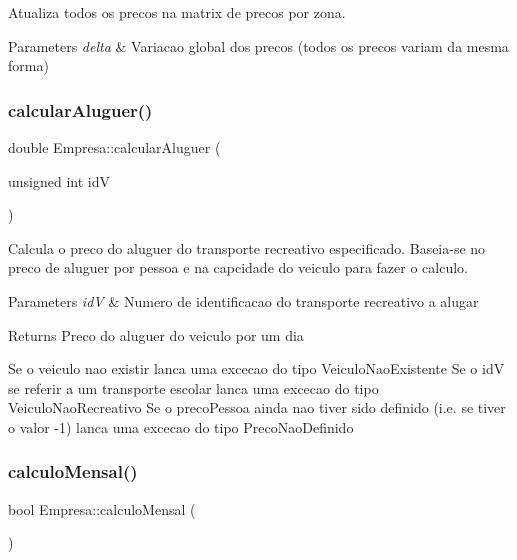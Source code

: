 Atualiza todos os precos na matrix de precos por zona. 


\begin{DoxyParams}{Parameters}
{\em delta} & Variacao global dos precos (todos os precos variam da mesma forma) \\
\hline
\end{DoxyParams}
\mbox{\label{class_empresa_a1aeac933b91a2abfb92d11ba51fe3699}} 
\subsubsection{\texorpdfstring{calcular\+Aluguer()}{calcularAluguer()}}
{\footnotesize\ttfamily double Empresa\+::calcular\+Aluguer (\begin{DoxyParamCaption}\item[{unsigned int}]{idV }\end{DoxyParamCaption})}



Calcula o preco do aluguer do transporte recreativo especificado. Baseia-\/se no preco de aluguer por pessoa e na capcidade do veiculo para fazer o calculo. 


\begin{DoxyParams}{Parameters}
{\em idV} & Numero de identificacao do transporte recreativo a alugar\\
\hline
\end{DoxyParams}
\begin{DoxyReturn}{Returns}
Preco do aluguer do veiculo por um dia
\end{DoxyReturn}
Se o veiculo nao existir lanca uma excecao do tipo Veiculo\+Nao\+Existente Se o idV se referir a um transporte escolar lanca uma excecao do tipo Veiculo\+Nao\+Recreativo Se o preco\+Pessoa ainda nao tiver sido definido (i.\+e. se tiver o valor -\/1) lanca uma excecao do tipo Preco\+Nao\+Definido \mbox{\label{class_empresa_a4a1e541280c5f7ae9e3f418d33b4cbd2}} 
\subsubsection{\texorpdfstring{calculo\+Mensal()}{calculoMensal()}}
{\footnotesize\ttfamily bool Empresa\+::calculo\+Mensal (\begin{DoxyParamCaption}{ }\end{DoxyParamCaption})}



